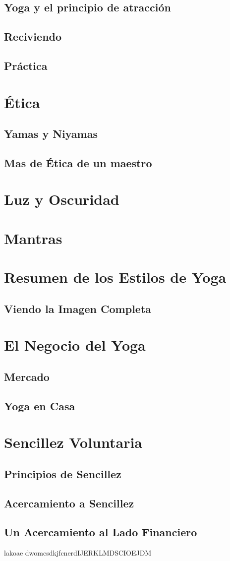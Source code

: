 \subsection{Yoga y el principio de atracción}
\subsection{Reciviendo}
\subsection{Práctica}
\section{Ética}
\subsection{Yamas y Niyamas}
\subsection{Mas de Ética de un maestro}
\section{Luz y Oscuridad}
\section{Mantras}
\section{Resumen de los Estilos de Yoga}
\subsection{Viendo la Imagen Completa}
\section{El Negocio del Yoga}
\subsection{Mercado}
\subsection{Yoga en Casa}
\section{Sencillez Voluntaria}
\subsection{Principios de Sencillez}
\subsection{Acercamiento a Sencillez}
\subsection{Un Acercamiento al Lado Financiero}

lakoae dwomcsdkjfcnerdIJERKLMDSCIOEJDM
